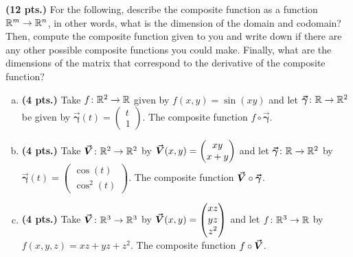 \documentclass[12pt]{article} %
\newcommand{\curvegamma}{\boldsymbol{\vec{\gamma}}}
\begin{document}
\vspace*{0.5cm}

\begin{problem}
\textbf{(12 pts.)} For the following, describe the composite function as a function $\mathbb{R}^m \to \mathbb{R}^n$, in other words, what is the dimension of the domain and codomain? Then, compute the composite function given to you and write down if there are any other possible composite functions you could make. Finally, what are the dimensions of the matrix that correspond to the derivative of the composite function?
\begin{enumerate}[(a)]
\item \textbf{(4 pts.)} Take $f\colon \mathbb{R}^2 \to \mathbb{R}$ given by $f(x,y)=\sin(xy)$ and let $\curvegamma \colon \R \to \R^2$ be given by $\curvegamma(t) = \begin{pmatrix} t \\ 1 \end{pmatrix}$. The composite function $f\circ \curvegamma$.
\item \textbf{(4 pts.)} Take $\boldsymbol{\vec{V}} \colon \mathbb{R}^2 \to \mathbb{R}^2$ by $\boldsymbol{\vec{V}}(x,y)= \begin{pmatrix} xy \\ x+y \end{pmatrix}$ and let $\curvegamma \colon \R \to \R^2$ by $\curvegamma(t) = \begin{pmatrix} \cos(t) \\ \cos^2(t) \end{pmatrix}$. The composite function $\vecfieldV \circ \curvegamma$.
\item \textbf{(4 pts.)} Take $\boldsymbol{\vec{V}} \colon \mathbb{R}^3 \to \mathbb{R}^3$ by $\boldsymbol{\vec{V}}(x,y)= \begin{pmatrix} xz \\ yz \\ z^2 \end{pmatrix}$ and let $f \colon \mathbb{R}^3 \to \mathbb{R}$ by $f(x,y,z) = xz + yz + z^2$. The composite function $f\circ \boldsymbol{\vec{V}}$.
\end{enumerate}
\end{problem}

\vspace*{0.5cm}
\end{document}
